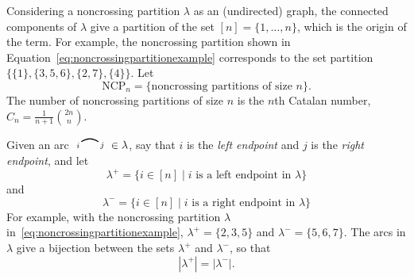 \documentclass[12pt]{article}
\theoremstyle{definition}
\theoremstyle{remark}
\numberwithin{equation}{section}
\newcommand{\NCP}{\mathrm{NCP}}
\newcommand{\edge}[2]{\tikz[scale = 0.75, baseline = -0.2cm]{
\draw (0.1, 0) node[inner sep = 0ex] (a) {};
\node[left, xshift = 0.1cm, yshift = -0.1cm] at (a) {$\scriptstyle #1$};
\draw (0.9, 0)  node[inner sep = 0ex] (b) {};
\node[right, xshift = -0.1cm, yshift = -0.1cm] at (b) {$\scriptstyle #2$};
\draw[thick] (a) to[out = 35, in = 145] (b);}}
\begin{document}
Considering a noncrossing partition $\lambda$ as an (undirected) graph, the connected components of $\lambda$ give a partition of the set $[n] = \{1, \ldots, n\}$, which is the origin of the term.  For example, the noncrossing partition shown in Equation~\eqref{eq:noncrossingpartitionexample} corresponds to the set partition $\{ \{1\}, \{3, 5, 6\}, \{2, 7\}, \{4\}  \}$.  Let
\[
\NCP_{n} = \{ \text{noncrossing partitions of size $n$} \}.
\]
The number of noncrossing partitions of size $n$ is the $n$th Catalan number, $C_{n} = \frac{1}{n+1}\binom{2n}{n}$.

Given an arc $ \edge{i}{j} \in \lambda$, say that $i$ is the \emph{left endpoint} and $j$ is the \emph{right endpoint}, and let
\[
\lambda^{+} = \{ i \in [n] \;|\; \text{$i$ is a left endpoint in $\lambda$} \}
\]
and
\[
\lambda^{-} = \{ i \in [n] \;|\; \text{$i$ is a right endpoint in $\lambda$} \}
\]
For example, with the noncrossing partition $\lambda$ in~\eqref{eq:noncrossingpartitionexample}, $\lambda^{+} = \{2, 3, 5\}$ and $\lambda^{-} = \{5, 6, 7\}$.  The arcs in $\lambda$ give a bijection between the sets $\lambda^{+}$ and $\lambda^{-}$, so that
\[
|\lambda^{+}| = |\lambda^{-}|.
\]
\end{document}
